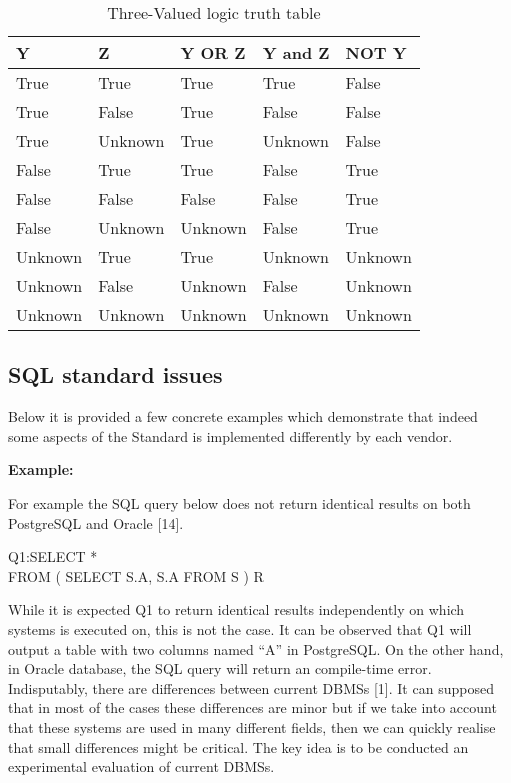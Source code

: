 \begin{table}[h]
\centering
\caption{Three-Valued logic truth table}
\label{my-label}
\begin{tabular}{|l|l|l|l|l| }
\hline
\textbf{Y} & \textbf{Z} & \textbf{Y OR Z} & \textbf{Y and Z} & \textbf{NOT Y} \\ \hline
True       & True       & True            & True             & False          \\ \hline
True       & False      & True            & False            & False          \\ \hline
True       & Unknown    & True            & Unknown          & False          \\ \hline
False      & True       & True            & False            & True           \\ \hline
False      & False      & False           & False            & True           \\ \hline
False      & Unknown    & Unknown         & False            & True           \\ \hline
Unknown    & True       & True            & Unknown          & Unknown        \\ \hline
Unknown    & False      & Unknown         & False            & Unknown        \\ \hline
Unknown    & Unknown    & Unknown         & Unknown          & Unknown        \\ \hline
\end{tabular}
\end{table}






\subsection{SQL standard issues} 

Below it is provided a few concrete examples which demonstrate that indeed some aspects of the Standard is implemented differently by each vendor. 
 
\noindent\textbf{Example:}

For example the SQL query below does not return identical results on both PostgreSQL and Oracle [14]. 


\begin{mdframed}[backgroundcolor=lightgray!20][h] 
Q1:SELECT * 
 \\FROM ( SELECT S.A, S.A FROM S ) R
\end{mdframed}

While it is expected Q1 to return identical results independently on which systems is executed on, this is not the case. It can be observed that Q1 will output a table with two columns named “A” in PostgreSQL. On the other hand, in Oracle database, the SQL query will return an compile-time error. Ιndisputably, there are differences between current DBMSs [1]. 
It can supposed that in most of the cases these differences are minor but if we take into account that these systems are used in many different fields, then we can quickly realise that small differences might be critical. The key idea is to be conducted an experimental evaluation of current DBMSs. 




